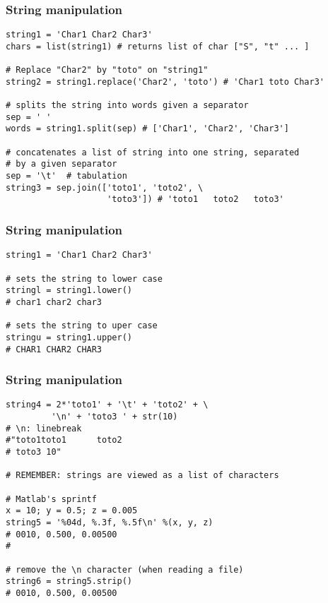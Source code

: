 \begin{frame}[fragile]
\frametitle{String manipulation}
\begin{lstlisting}
string1 = 'Char1 Char2 Char3'
chars = list(string1) # returns list of char ["S", "t" ... ]

# Replace "Char2" by "toto" on "string1"
string2 = string1.replace('Char2', 'toto') # 'Char1 toto Char3'

# splits the string into words given a separator
sep = ' '
words = string1.split(sep) # ['Char1', 'Char2', 'Char3']

# concatenates a list of string into one string, separated
# by a given separator
sep = '\t'  # tabulation
string3 = sep.join(['toto1', 'toto2', \
                    'toto3']) # 'toto1   toto2   toto3'
\end{lstlisting}
\end{frame}

\begin{frame}[fragile]
\frametitle{String manipulation}
\begin{lstlisting}
string1 = 'Char1 Char2 Char3'

# sets the string to lower case
stringl = string1.lower()
# char1 char2 char3

# sets the string to uper case
stringu = string1.upper()
# CHAR1 CHAR2 CHAR3
\end{lstlisting}
\end{frame}

\begin{frame}[fragile]
\frametitle{String manipulation}
\begin{lstlisting}
string4 = 2*'toto1' + '\t' + 'toto2' + \
         '\n' + 'toto3 ' + str(10)
# \n: linebreak
#"toto1toto1      toto2
# toto3 10"

# REMEMBER: strings are viewed as a list of characters

# Matlab's sprintf 
x = 10; y = 0.5; z = 0.005
string5 = '%04d, %.3f, %.5f\n' %(x, y, z) 
# 0010, 0.500, 0.00500
# 

# remove the \n character (when reading a file)
string6 = string5.strip() 
# 0010, 0.500, 0.00500
\end{lstlisting}
\end{frame}

